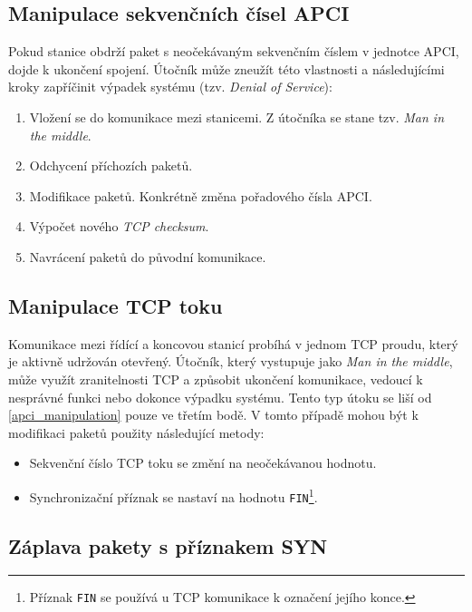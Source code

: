 \subsection*{Manipulace sekvenčních čísel APCI}
\label{apci_manipulation}

Pokud stanice obdrží paket s neočekávaným sekvenčním číslem v jednotce APCI, dojde k ukončení spojení. Útočník může zneužít této vlastnosti a následujícími kroky zapříčinit výpadek systému (tzv. \emph{Denial of Service}): 

\begin{enumerate}
    \item Vložení se do komunikace mezi stanicemi. Z útočníka se stane tzv. \emph{Man in the middle}.
    \item Odchycení příchozích paketů.
    \item Modifikace paketů. Konkrétně změna pořadového čísla APCI.
    \item Výpočet nového \emph{TCP checksum}.
    \item Navrácení paketů do původní komunikace.
\end{enumerate}


\subsection*{Manipulace TCP toku}

Komunikace mezi řídící a koncovou stanicí probíhá v jednom TCP proudu, který je aktivně udržován otevřený.
Útočník, který vystupuje jako \emph{Man in the middle}, může využít zranitelnosti TCP a způsobit ukončení komunikace, vedoucí k nesprávné funkci nebo dokonce výpadku systému. Tento typ útoku se liší od \ref{apci_manipulation} pouze ve třetím bodě. V tomto případě mohou být k modifikaci paketů použity následující metody:

\begin{itemize}
    \item Sekvenční číslo TCP toku se změní na neočekávanou hodnotu.
    \item Synchronizační příznak se nastaví na hodnotu \texttt{FIN}\footnote{Příznak \texttt{FIN} se používá u TCP komunikace k označení jejího konce.}.
\end{itemize}


\subsection*{Záplava pakety s příznakem SYN}

